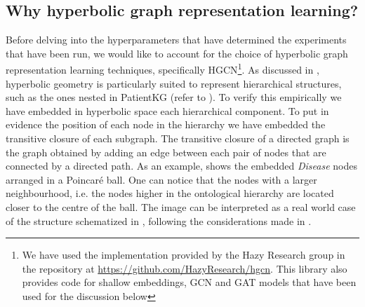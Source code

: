 \subsection{Why hyperbolic graph representation learning?}\label{sec:hypPatientKG}
Before delving into the hyperparameters that have determined the experiments that have been run, we would like to account for the choice of hyperbolic graph representation learning techniques, specifically HGCN\footnote{We have used the implementation provided by the Hazy Research group in the repository at \url{https://github.com/HazyResearch/hgcn}. This library also provides code for shallow embeddings, GCN and GAT models that have been used for the discussion below}. As discussed in , hyperbolic geometry is particularly suited to represent hierarchical structures, such as the ones nested in PatientKG (refer to ). To verify this empirically we have embedded in hyperbolic space each hierarchical component. To put in evidence the position of each node in the hierarchy we have embedded the transitive closure of each subgraph. The transitive closure of a directed graph is the graph obtained by adding an edge between each pair of nodes that are connected by a directed path. As an example,  shows the embedded \emph{Disease} nodes arranged in a Poincaré ball. One can notice that the nodes with a larger neighbourhood, i.e. the nodes higher in the ontological hierarchy are located closer to the centre of the ball. The image can be interpreted as a real world case of the structure schematized in , following the considerations made in . 


